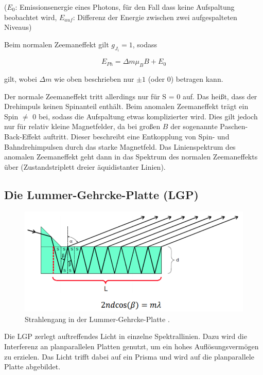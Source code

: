 ($E_0$: Emissionsenergie eines Photons, für den Fall dass keine Aufspaltung beobachtet wird, $E_{auf}$: Differenz der
Energie zwischen zwei aufgespalteten Niveaus)

Beim normalen Zeemaneffekt gilt $g_{J_i} = 1$, sodass

\begin{equation}
	E_{Ph} = \Delta m \mu_B B + E_0
\end{equation}

gilt, wobei $\Delta m$ wie oben beschrieben nur $\pm 1$ (oder 0) betragen kann.

Der normale Zeemaneffekt tritt allerdings nur für S = 0 auf. Das heißt, dass der Drehimpuls keinen Spinanteil enthält.
Beim anomalen Zeemaneffekt trägt ein Spin $\neq$ 0 bei, sodass die Aufspaltung etwas komplizierter wird.
Dies gilt jedoch nur für relativ kleine Magnetfelder, da bei großen $B$ der sogenannte Paschen-Back-Effekt auftritt.
Dieser beschreibt eine Entkopplung von Spin- und Bahndrehimpulsen durch das starke Magnetfeld. Das Linienspektrum des
anomalen Zeemaneffekt geht dann in das Spektrum des normalen Zeemaneffekts über (Zustandstriplett dreier äquidistanter
Linien).

\subsection{Die Lummer-Gehrcke-Platte (LGP)}

\begin{figure}
\centering
\includegraphics[width=\textwidth]{platte.png}
\caption{Strahlengang in der Lummer-Gehrcke-Platte \cite[2]{anleitung}.}
\label{fig:platte}
\end{figure}

Die LGP zerlegt auftreffendes Licht in einzelne Spektrallinien. Dazu wird die Interferenz an planparallelen Platten
genutzt, um ein hohes Auflösungsvermögen zu erzielen. Das Licht trifft dabei auf ein Prisma und wird auf die planparallele
Platte abgebildet.

